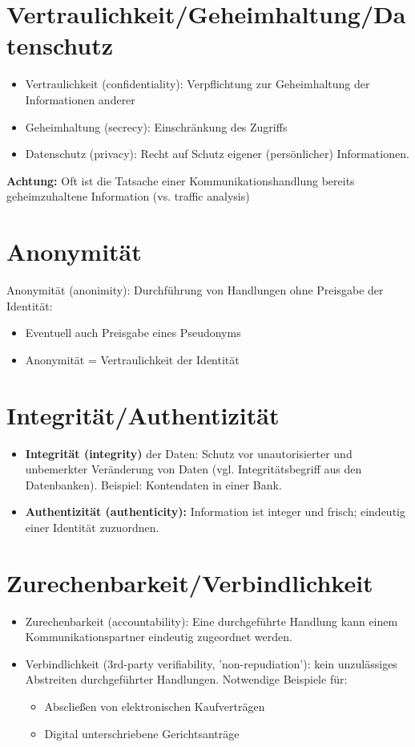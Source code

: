 \documentclass[openany]{book}
\begin{document}
\section{Vertraulichkeit/Geheimhaltung/Datenschutz}

\begin{itemize}
\item Vertraulichkeit (confidentiality): Verpflichtung zur Geheimhaltung der Informationen anderer
\item Geheimhaltung (secrecy): Einschränkung des Zugriffs
\item Datenschutz (privacy): Recht auf Schutz eigener (persönlicher) Informationen. 
\end{itemize}

\textbf{Achtung:} Oft ist die Tatsache einer Kommunikationshandlung bereits geheimzuhaltene Information (vs. traffic analysis)

\section{Anonymität}

Anonymität (anonimity): Durchführung von Handlungen ohne Preisgabe der Identität:
\begin{itemize}
\item Eventuell auch Preisgabe eines Pseudonyms
\item Anonymität = Vertraulichkeit der Identität
\end{itemize} 

\section{Integrität/Authentizität}

\begin{itemize}
\item \textbf{Integrität (integrity)} der Daten: Schutz vor unautorisierter und unbemerkter Veränderung von Daten (vgl. Integritätsbegriff aus den Datenbanken). Beispiel: Kontendaten in einer Bank.
\item \textbf{Authentizität (authenticity):} Information ist integer und frisch; eindeutig einer Identität zuzuordnen.
\end{itemize}

\section{Zurechenbarkeit/Verbindlichkeit}

\begin{itemize}
\item Zurechenbarkeit (accountability): Eine durchgeführte Handlung kann einem Kommunikationspartner eindeutig zugeordnet werden.
\item Verbindlichkeit (3rd-party verifiability, 'non-repudiation'): kein unzulässiges Abstreiten durchgeführter Handlungen. Notwendige Beispiele für:
\begin{itemize}
\item Abscließen von elektronischen Kaufverträgen
\item Digital unterschriebene Gerichtsanträge
\end{itemize}
\end{itemize}
\end{document}
